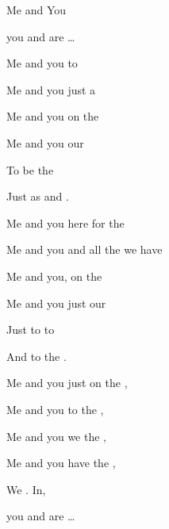 \begin{SBSong}{Me and You}
\begin{SBVerse}
    you and  are  \ldots
  \end{SBVerse}  
  \CBPageBrk
  \begin{SBVerse}
    Me and you  to 
    
    Me and you just  a 
    
    Me and you  on the 
    
    Me and you  our 
    
    To be  the 
    
    Just as  and .
  \end{SBVerse}  
  \begin{SBVerse}  
    Me and you here  for the 
    
    Me and you and all the  we have 
    
    Me and you,  on the 
    
    Me and you just  our 
    
    Just to  to 
    
    And to  the .
  \end{SBVerse}  
  \begin{SBVerse}  
    Me and you just  on the ,

    Me and you  to the ,
    
    Me and you we  the ,
    
    Me and you have  the ,
    
    We . In,
    
    you and  are  \ldots 

  \end{SBVerse}
\end{SBSong}

